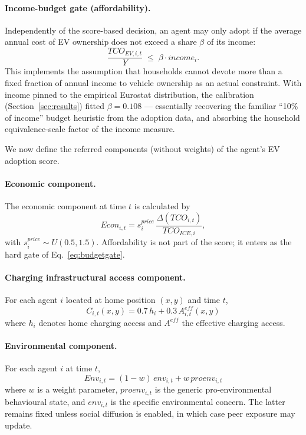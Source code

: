 \documentclass[11pt]{article}
\begin{document}
\paragraph{Income-budget gate (affordability).} Independently of the
score-based decision, an agent may only adopt if the average annual cost of
EV ownership does not exceed a share $\beta$ of its income:
\begin{equation}
\frac{TCO_{EV,i,t}}{Y} \;\leq\; \beta \cdot income_i .
\label{eq:budgetgate}
\end{equation}
This implements the assumption that households cannot devote more than a
fixed fraction of annual income to vehicle ownership as an actual
constraint. With income pinned to the empirical Eurostat distribution, the
calibration (Section~\ref{sec:results}) fitted $\beta = 0.108$ ---
essentially recovering the familiar ``10\% of income'' budget heuristic
from the adoption data, and absorbing the household equivalence-scale
factor of the income measure.

We now define the referred components (without weights) of the agent's EV
adoption score.

\paragraph{Economic component.} The economic component at time $t$ is
calculated by
\begin{equation}
Econ_{i,t} = s^{price}_i \, \frac{\Delta(TCO_{i,t})}{TCO_{ICE,i}},
\end{equation}
with $s^{price}_i \sim U(0.5, 1.5)$. Affordability is not part of the
score; it enters as the hard gate of Eq.~\eqref{eq:budgetgate}.

\paragraph{Charging infrastructural access component.} For each agent $i$
located at home position $(x,y)$ and time $t$,
\begin{equation}
C_{i,t}(x,y) = 0.7\, h_i + 0.3\, A^{e\!f\!f}_{i,t}(x,y)
\end{equation}
where $h_i$ denotes home charging access and $A^{e\!f\!f}$ the effective
charging access.

\paragraph{Environmental component.} For each agent $i$ at time $t$,
\begin{equation}
Env_{i,t} = (1-w)\, env_{i,t} + w\, proenv_{i,t}
\end{equation}
where $w$ is a weight parameter, $proenv_{i,t}$ is the generic
pro-environmental behavioural state, and $env_{i,t}$ is the specific
environmental concern. The latter remains fixed unless social diffusion is
enabled, in which case peer exposure may update.
\end{document}
